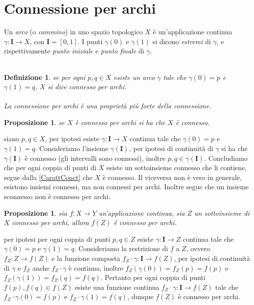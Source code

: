 \documentclass[oneside, 11pt]{amsbook}
\makeatletter
\newcommand{\0}{{(0)}}
\newcommand{\3}{{(3)}}
\theoremstyle{colonplain}
\newtheorem{prop}[thm]{Proposizione}
\theoremstyle{colondefinition}
\newtheorem{defn}[thm]{Definizione}
\theoremstyle{colonremark}
\numberwithin{equation}{chapter}
\renewcommand{\proofname}{Dimostrazione}
\renewenvironment{proof}[1][\proofname]{\par
  \pushQED{\qed}%
  \normalfont \topsep6\p@\@plus6\p@\relax
  \trivlist
  \item[\hskip\labelsep\bfseries #1:]\ignorespaces
}{%
  \popQED\endtrivlist\@endpefalse
}
\makeatother
\begin{document}
\section{Connessione per archi}
Un \textit{arco} (o \textit{cammino}) in uno spazio topologico $X$ è un'applicazione continua $\gamma : \mathbf{I} \longrightarrow X$, con $\mathbf{I} = [0, 1]$. I punti $\gamma(0)$ e $\gamma(1)$ si dicono \textit{estremi} di $\gamma$, e rispettivamente \textit{punto iniziale} e \textit{punto finale} di $\gamma$. \\ \\
\begin{defn}
se per ogni $p, q \in X$ esiste un arco $\gamma$ tale che $\gamma(0) = p$ e $\gamma(1) = q$, $X$ si dice \textit{connesso per archi}. \\ \\
La connessione per archi è una proprietà più forte della connessione.
\end{defn}
\begin{prop}
se $X$ è connesso per archi si ha che $X$ è connesso.
\end{prop}
\begin{proof}
siano $p, q \in X$, per ipotesi esiste $\gamma : \mathbf{I} \longrightarrow X$ continua tale che $\gamma(0) = p$ e $\gamma(1) = q$. Consideriamo l'insieme $\gamma(\mathbf{I})$, per ipotesi di continuità di $\gamma$ si ha che $\gamma(\mathbf{I})$ è connesso (gli intervalli sono connessi), inoltre $p, q \in \gamma(\mathbf{I})$. Concludiamo che per ogni coppia di punti di $X$ esiste un sottoinsieme connesso che li contiene, segue dalla \cref{CarattConct} che $X$ è connesso.
\end{proof}
Il viceversa non è vero in generale, esistono insiemi connessi, ma non connessi per archi. Inoltre segue che un insieme sconnesso non è connesso per archi.
\begin{prop}
sia $f : X \longrightarrow Y$ un'applicazione continua, sia $Z$ un sottoinsieme di $X$ connesso per archi, allora $f(Z)$ è connesso per archi.
\end{prop}
\begin{proof}
per ipotesi per ogni coppia di punti $p, q \in Z$ esiste $\gamma : \mathbf{I} \longrightarrow Z$ continua tale che $\gamma(0) = p$ e $\gamma(1) = q$. Consideriamo la restrizione di $f$ a $Z$, ovvero $f_Z : Z \longrightarrow f(Z)$ e la funzione composta $f_Z \cdot \gamma : \mathbf{I} \longrightarrow f(Z)$, per ipotesi di continuità di $\gamma$ e $f_Z$ anche $f_Z \cdot \gamma$ è continua, inoltre $f_Z(\gamma(0)) = f_Z(p) = f(p)$ e $f_Z(\gamma(1)) = f_Z(q) = f(q)$. Pertanto per ogni coppia di punti $f(p), f(q) \in f(Z)$ esiste una funzione continua $f_Z \cdot \gamma : \mathbf{I} \longrightarrow f(Z)$ tale che $f_Z \cdot \gamma (0) = f(p)$ e $f_Z \cdot \gamma (1) = f(q)$, dunque $f(Z)$ è connesso per archi.
\end{proof}
\end{document}
